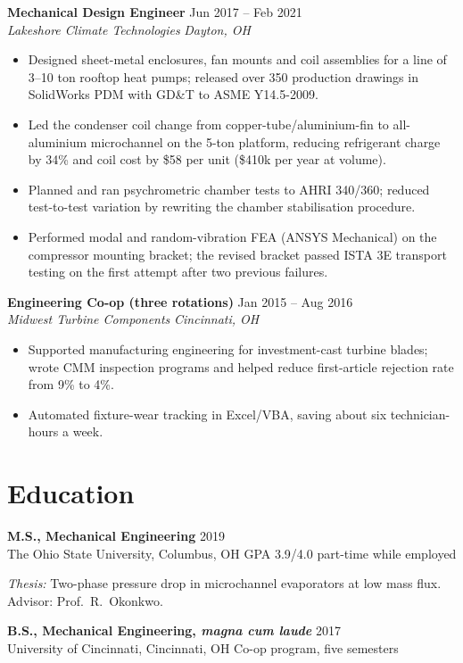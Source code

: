 \documentclass[11pt,letterpaper]{article}
\newcommand{\job}[4]{%
  \textbf{#1} \hfill {\color{muted}#2}\\
  \textit{#3} \hfill {\color{muted}\textit{#4}}\par\vspace{2pt}}
\newcommand{\degree}[4]{%
  \textbf{#1} \hfill {\color{muted}#2}\\
  #3 \hfill {\color{muted}#4}\par\vspace{3pt}}
\begin{document}
\job{Mechanical Design Engineer}{Jun 2017 -- Feb 2021}
    {Lakeshore Climate Technologies}{Dayton, OH}
\begin{itemize}
  \item Designed sheet-metal enclosures, fan mounts and coil assemblies for a line of 3--10 ton rooftop heat pumps; released over 350 production drawings in SolidWorks PDM with GD\&T to ASME Y14.5-2009.
  \item Led the condenser coil change from copper-tube/aluminium-fin to all-aluminium microchannel on the 5-ton platform, reducing refrigerant charge by 34\% and coil cost by \$58 per unit (\$410k per year at volume).
  \item Planned and ran psychrometric chamber tests to AHRI 340/360; reduced test-to-test variation by rewriting the chamber stabilisation procedure.
  \item Performed modal and random-vibration FEA (ANSYS Mechanical) on the compressor mounting bracket; the revised bracket passed ISTA 3E transport testing on the first attempt after two previous failures.
\end{itemize}
\vspace{4pt}

\job{Engineering Co-op (three rotations)}{Jan 2015 -- Aug 2016}
    {Midwest Turbine Components}{Cincinnati, OH}
\begin{itemize}
  \item Supported manufacturing engineering for investment-cast turbine blades; wrote CMM inspection programs and helped reduce first-article rejection rate from 9\% to 4\%.
  \item Automated fixture-wear tracking in Excel/VBA, saving about six technician-hours a week.
\end{itemize}

\section{Education}

\degree{M.S., Mechanical Engineering}{2019}
       {The Ohio State University, Columbus, OH}{GPA 3.9/4.0 \textbullet{} part-time while employed}
\textit{Thesis:} Two-phase pressure drop in microchannel evaporators at low mass flux. Advisor: Prof.\ R.~Okonkwo.
\vspace{4pt}

\degree{B.S., Mechanical Engineering, \textit{magna cum laude}}{2017}
       {University of Cincinnati, Cincinnati, OH}{Co-op program, five semesters}
\end{document}
